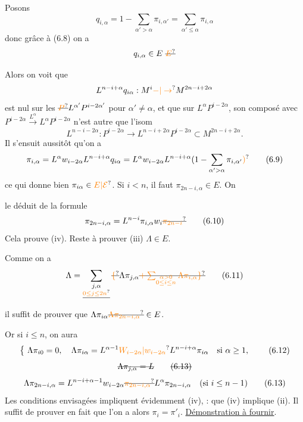 Posons
\[
 q_{i,\alpha}=1-\sum_{\alpha'>\alpha}\pi_{i,\alpha'}=\sum_{\alpha'\le\alpha}\pi_{i,\alpha}
\]
donc grâce à (6.8) on a
\[
 q_{i,\alpha}\in E\ \deleted{\unsure{E}}
\]

Alors on voit que
\[
 L^{n-i+\alpha}q_{i\alpha}: M^i\unsure{-|\to}M^{2n-i+2\alpha}
\]
est nul sur les $\deleted{\unsure{P}}L^{\alpha'}P^{i-2\alpha'}$ pour $\alpha'\ne\alpha$, et que sur $L^\alpha P^{i-2\alpha}$,  son composé avec $P^{i-2\alpha}\xrightarrow{L^\alpha} L^\alpha P^{i-2\alpha}$ n'est autre que l'isom
\[
 L^{n-i-2\alpha}:P^{i-2\alpha}\longrightarrow L^{n-i+2\alpha}P^{i-2\alpha}\subset M^{2n-i+2\alpha}.
\]
Il s'ensuit aussitôt qu'on a
\[
 \pi_{i,\alpha}=L^\alpha w_{i-2\alpha}L^{n-i+\alpha}q_{i\alpha}
 =L^\alpha w_{i-2\alpha}L^{n-i+\alpha}(1-\sum_{\alpha'>\alpha}\pi_{i,\alpha'}\unsure{)}
 \tag*{(6.9)}
\]
ce qui donne bien $\pi_{i\alpha}\in\unsure{E|\mathcal E}$.  Si $i<n$, il faut  $\pi_{2n-i,\alpha}\in E$. On

le déduit  de la formule
\[
 \pi_{2n-i,\alpha}=L^{n-i}\pi_{i,\alpha}w_i\deleted{\unsure{\pi_{2n-i}}}
 \tag*{(6.10)}
\]
Cela prouve  (iv). Reste à prouver (iii) $\Lambda\in E$.

Comme on a
\[
 \Lambda=\sum_{\substack{j,\alpha\\\deleted{\unsure{0\le j\le 2n}}}}\deleted{\unsure{\{}}\Lambda\pi_{j,\alpha}
 \deleted{\unsure{+\sum_{\substack{\alpha>0\\0\le i\le n}}\Lambda\pi_{i,\alpha}\}}}
 \tag*{(6.11)}
\]
il suffit de prouver que $\Lambda\pi_{i\alpha}\deleted{\unsure{\Lambda\pi_{2n-i,\alpha}}}\in E$.

Or si $i\le n$, on aura
\[
 \left\{\ \Lambda\pi_{i0}=0,\quad \Lambda\pi_{i\alpha}=L^{\alpha-1}\unsure{W_{i-2\alpha}|w_{i-2\alpha}} L^{n-i+\alpha}\pi_{i\alpha}\quad\text{si }\alpha\ge1,\right.
 \tag*{(6.12)}
\]
\[
 \deleted{\Lambda\pi_{j,\alpha}=L}\tag*{\deleted{(6.13)}}
\]
\[
 \Lambda\pi_{2n-i,\alpha}=L^{n-i+\alpha-1}w_{i-2\alpha}\deleted{\unsure{\pi_{2n-i,\alpha}}}L^\alpha\pi_{2n-i,\alpha}\quad(\text{si }i\le n-1)
 \tag*{(6.13)}
\]
Les conditions envisagées impliquent évidemment (iv), :  que (iv) implique (ii). Il suffit de prouver en fait que l'on a alors $\pi_i=\pi'_i$. \uline{Démonstration à fournir}.

